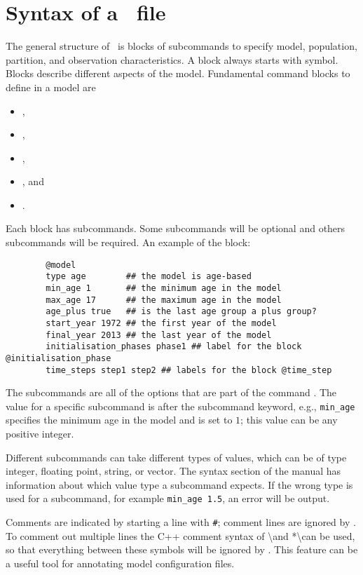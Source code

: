 \section{Syntax of a \CNAME\ file}\label{Sec:stru}

The general structure of \CNAME\ is blocks of subcommands to specify model, population, partition, and observation characteristics. A block always starts with \command{} symbol. Blocks describe different aspects of the model. Fundamental command blocks to define in a model are

\begin{itemize}
	\item {},
	\item {},
	\item {},
	\item {}, and
	\item {}.
\end{itemize}

Each block has subcommands. Some subcommands will be optional and others subcommands will be required. An example of the  block:

{\small{\begin{verbatim}
		@model
		type age		## the model is age-based
		min_age 1		## the minimum age in the model
		max_age 17		## the maximum age in the model
		age_plus true	## is the last age group a plus group?
		start_year 1972	## the first year of the model
		final_year 2013 ## the last year of the model
		initialisation_phases phase1 ## label for the block @initialisation_phase
		time_steps step1 step2 ## labels for the block @time_step
		\end{verbatim}}}

The subcommands are all of the options that are part of the command . The value for a specific subcommand is after the subcommand keyword, e.g., \texttt{min\_age} specifies the minimum age in the model and is set to $1$; this value can be any positive integer.

Different subcommands can take different types of values, which can be of type integer, floating point, string, or vector. The syntax section of the manual has information about which value type a subcommand expects. If the wrong type is used for a subcommand, for example \texttt{min\_age 1.5}, an error will be output.

Comments are indicated by starting a line with \texttt{\#}; comment lines are ignored by \CNAME. To comment out multiple lines the C++ comment syntax of \textbackslash* and *\textbackslash can be used, so that everything between these symbols will be ignored by \CNAME. This feature can be a useful tool for annotating model configuration files. 

